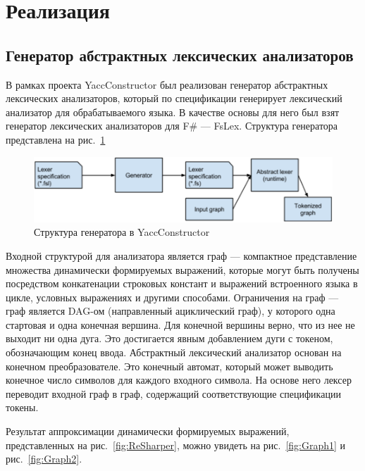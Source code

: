 \section{Реализация}


\subsection {Генератор абстрактных лексических анализаторов}

В рамках проекта YaccConstructor был реализован генератор абстрактных лексических анализаторов, который по спецификации генерирует лексический 
анализатор для обрабатываемого языка. В качестве основы для него был взят генератор лексических анализаторов для F\# --- FsLex. 
Структура генератора представлена на рис.~\ref{fig:Generator}

\begin{figure}[t]
\centering
\includegraphics[width=\textwidth]{Polubelova/Generator}
\caption{Структура генератора в YaccConstructor}
\label{fig:Generator} 
\end{figure}

Входной структурой для анализатора является граф --- компактное представление множества динамически формируемых выражений, которые могут быть получены 
посредством конкатенации строковых констант и выражений встроенного языка в цикле, условных выражениях и другими способами. Ограничения на граф --- граф 
является DAG-ом (направленный ациклический граф), у которого одна стартовая и одна конечная вершина. Для конечной вершины верно, что из нее не выходит ни 
одна дуга. Это достигается явным добавлением дуги с токеном, обозначающим конец ввода. Абстрактный лексический анализатор основан на конечном преобразователе. 
Это конечный автомат, который может выводить конечное число символов для каждого входного символа. На основе него лексер переводит входной граф в граф, 
содержащий соответствующие спецификации токены. 

Результат аппроксимации динамически формируемых выражений, представленных на рис.~\ref{fig:ReSharper}, можно увидеть на рис.~\ref{fig:Graph1} и рис.~\ref{fig:Graph2}.
	
